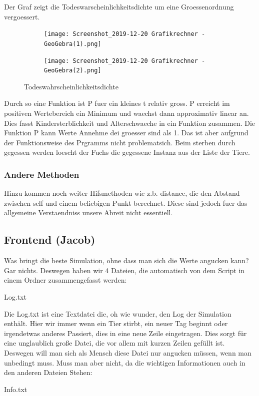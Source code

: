 \documentclass[12pt]{article}
\begin{document}
Der Graf zeigt die Todeswarscheinlichkeitsdichte um eine Groessenordnung vergoessert.
\begin{figure}[h!]
  \centering
  \begin{subfigure}[b]{0.4\linewidth}
    \texttt{[image: Screenshot\_2019-12-20 Grafikrechner - GeoGebra(1).png]}
  \end{subfigure}
  \begin{subfigure}[b]{0.4\linewidth}
    \texttt{[image: Screenshot\_2019-12-20 Grafikrechner - GeoGebra(2).png]}
  \end{subfigure}
  \caption{Todeswahrscheinlichkeitsdichte}
  \label{fig:coffee}
\end{figure}
\newpage
Durch so eine Funktion ist P fuer ein kleines t relativ gross.
P erreicht im positiven Wertebereich ein Minimum und waechst dann approximativ linear an.
Dies fasst Kindersterblichkeit und Alterschwaeche in ein Funktion zusammen.
Die Funktion P kann Werte Annehme dei groesser sind als 1.
Das ist aber aufgrund der Funktionsweise des Prgramms nicht problematsich.
Beim sterben durch gegessen werden loescht der Fuchs die gegessene Instanz aus der Liste der Tiere.
\subsubsection{Andere Methoden}
Hinzu kommen noch weiter Hifsmethoden wie z.b. \colorbox{gray!40}{distance}, die
den Abstand zwischen self und einem beliebigen Punkt berechnet.
Diese sind jedoch fuer das allgemeine Verstaendniss unsere Abreit nicht essentiell.
\subsection{Frontend (Jacob)}
Was bringt die beste Simulation, ohne dass man sich die Werte angucken kann? Gar
nichts. Deswegen haben wir 4 Dateien, die automatisch von dem Script in einem Ordner
zusammengefasst werden:

 Log.txt

Die Log.txt ist eine Textdatei die, oh wie wunder, den Log der Simulation enthält.
Hier wir immer wenn ein Tier stirbt, ein neuer Tag beginnt oder irgendetwas anderes
Passiert, dies in eine neue Zeile eingetragen. Dies sorgt für eine unglaublich große
Datei, die vor allem mit kurzen Zeilen gefüllt ist. Deswegen will man sich als
Mensch diese Datei nur angucken müssen, wenn man unbedingt muss. Muss man
aber nicht, da die wichtigen Informationen auch in den anderen Dateien Stehen:

Info.txt
    
\end{document}
